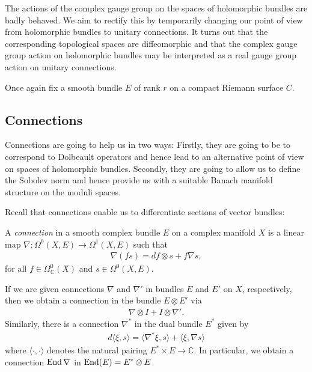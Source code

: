 \documentclass[12pt]{ociamthesis}  %
\begin{document}
The actions of the complex gauge group on the spaces of holomorphic
bundles are badly behaved. We aim to rectify this by temporarily
changing our point of view from holomorphic bundles to unitary
connections. It turns out that the corresponding topological spaces
are diffeomorphic and that the complex gauge group action on holomorphic bundles
may be interpreted as a real gauge group action on unitary connections.

Once again fix a smooth bundle $E$ of rank $r$ on a compact
Riemann surface $C$.

\subsection{Connections}

Connections are going to help us in two ways: Firstly, they are going to
be to correspond to Dolbeault operators and hence lead to an
alternative point of view on spaces of holomorphic bundles.
Secondly, they are going to allow us to define the Sobolev norm and
hence provide us with a suitable Banach manifold structure on
the moduli spaces.

Recall that connections enable us to differentiate sections of
vector bundles:

\begin{definition}
  A \emph{connection} in a smooth complex bundle $E$ on
  a complex manifold $X$ is a linear map $\nabla : \Omega^0(X,E) \to \Omega^1(X,E)$
  such that
  \begin{align*}
    \nabla (fs) = df \otimes s + f\nabla s,
  \end{align*}
  for all $f\in \Omega^0_{\mathbb C}(X)$ and $s\in\Omega^0(X,E)$.
\end{definition}

\begin{example}\label{ex:connection_on_end}
  If we are given connections $\nabla$ and $\nabla'$ in bundles $E$ and $E'$ on $X$,
  respectively, then we obtain a connection in the bundle $E\otimes E'$ via
  \begin{align*}
    \nabla \otimes I + I \otimes \nabla'.
  \end{align*}
  Similarly, there is a connection $\nabla^*$ in the dual bundle $E^*$ given by
  \begin{align*}
    d\langle \xi,s\rangle
    = \langle \nabla^*\xi, s \rangle + \langle \xi,\nabla s\rangle
  \end{align*}
  where $\langle\cdot,\cdot\rangle$ denotes the natural pairing $E^*\times E\to\mathbb{C}$.
  In particular, we obtain a connection $\operatorname{End}\nabla$ in $\operatorname{End}(E) = E^* \otimes E$.
\end{example}
\end{document}
